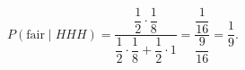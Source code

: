 \[
P(\text{fair}\mid HHH)=\dfrac{\dfrac{1}{2}\cdot\dfrac{1}{8}}{\dfrac{1}{2}\cdot\dfrac{1}{8}+\dfrac{1}{2}\cdot1}=\dfrac{\dfrac{1}{16}}{\dfrac{9}{16}}=\boxed{\dfrac{1}{9}}.
\]
